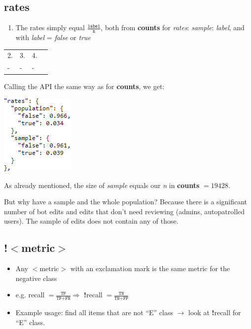 \documentclass[12pt,a4paper]{article}
\begin{document}
\subsection{rates}
\begin{enumerate}
\item The rates simply equal $\frac{\texttt{label}}{\texttt{n}}$, both from \textbf{counts} for \textit{rates}: \textit{sample}: \textit{label}, and with \textit{label} = \textit{false} or \textit{true}
\end{enumerate}
\begin{tabular}{|l|l|l|l|}
\hline
2. & 3. & 4.\\ 
- & - & - \\ \hline
\end{tabular}
\begin{description}
\item Calling the API the same way as for \textbf{counts}, we get:
\item \includegraphics[scale=1]{resources/4/enwikiDamagingRates}
\item As already mentioned, the size of \textit{sample} equals our \textit{n} in \textbf{counts} $= 19428$.
\item But why have a sample and the whole population? Because there is a significant number of bot edits and edits that don't need reviewing (admins, autopatrolled users). The sample of edits does not contain any of those.
\end{description}
%
\subsection{!$<$metric$>$}
\begin{itemize}
\item Any $<$metric$>$ with an exclamation mark is the same metric for the negative class
\item e.g. recall $= \frac{\texttt{TP}}{\texttt{TP} + \texttt{FN}} \Rightarrow$ \textbf{!}recall  $= \frac{\texttt{TN}}{\texttt{TN} + \texttt{FP}}$
\item Example usage: find all items that are not ``E'' class $\rightarrow$ look at \textbf{!}recall for ``E'' class.
\end{itemize}
\end{document}
